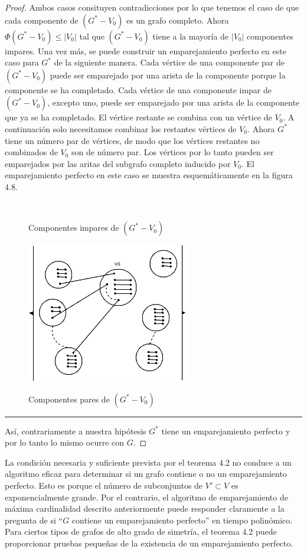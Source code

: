 \documentclass[10pt,a5paper]{book}
\begin{document}
\begin{proof}
Ambos casos consituyen contradicciones por lo que tenemos el caso de que cada componente de $(G^* - V_0)$ es un grafo completo. Ahora $\Phi(G^* - V_0) \le |V_0|$ tal que $(G^* - V_0)$ tiene a la mayoría de $|V_0|$ componentes impares. Una vez más, se puede construir un emparejamiento perfecto en este caso para $G^*$ de la siguiente manera. Cada vértice de una componente par de $(G^* - V_0)$ puede ser emparejado por una arista de la componente porque la componente se ha completado. Cada vértice de una componente impar de $(G^* - V_0)$, excepto uno, puede ser emparejado por una arista de la componente que ya se ha completado. El vértice restante se combina con un vértice de $V_0$. A continuación solo necesitamos combinar los restantes vértices de $V_0$. Ahora $G^*$ tiene un número par de vértices, de modo que los vértices restantes no combinados de $V_0$ son de número par. Los vértices por lo tanto pueden ser emparejados por las aritas del subgrafo completo inducido por $V_0$. El emparejamiento perfecto en este caso se muestra esquemáticamente en la figura 4.8.

\begin{figure}[H]
\caption{ }
\hrulefill{}\\
\hspace*{-.6in}\parbox{2cm}
{
Componentes impares de $(G^* - V_0)$
}
\parbox{5cm}
{
\includegraphics[width=7.1cm]{Fig4_8.png}
}
\hspace*{.8in}\parbox{2cm}
{
Componentes pares de $(G^* - V_0)$
}
\end{figure}
\hrule{}
\pagebreak
Así, contrariamente a nuestra hipótesis $G^*$ tiene un emparejamiento perfecto y por lo tanto lo mismo ocurre con $G$.
\end{proof}

La condición necesaria y suficiente prevista por el teorema 4.2 no conduce a un algoritmo eficaz para determinar si un grafo contiene o no un emparejamiento perfecto. Esto es porque el número de subconjuntos de $V' \subset V$ es exponencialmente grande. Por el contrario, el algoritmo de emparejamiento de máxima cardinalidad descrito anteriormente puede responder claramente a la pregunta de si ``$G$ contiene un emparejamiento perfecto'' en tiempo polinómico. Para ciertos tipos de grafos de alto grado de simetría, el teorema 4.2 puede proporcionar pruebas pequeñas de la existencia de un emparejamiento perfecto.
\end{document}
